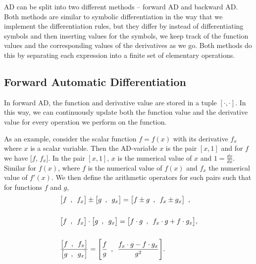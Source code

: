 AD can be split into two different methods -- forward AD and backward AD. Both methods are similar to symbolic differentiation in the way that we implement the differentiation rules, but they differ by instead of differentiating symbols and then inserting values for the symbols, we keep track of the function values and the corresponding values of the derivatives as we go. Both methods do this by separating each expression into a finite set of elementary operations. 

\subsection{Forward Automatic Differentiation}
In forward AD, the function and derivative value are stored in a tuple $[\cdot, \cdot]$. In this way, we can continuously update both the function value and the derivative value for every operation we perform on the function. 

As an example, consider the scalar function $f = f(x)$ with its derivative $f_x$ where $x$ is a scalar variable. Then the AD-variable $x$ is the pair $[x, 1]$ and for $f$ we have [$f$, $f_x$]. In the pair $[x,1]$, $x$ is the numerical value of $x$ and $1 = \frac{dx}{dx}$. Similar for $f(x)$, where $f$ is the numerical value of $f(x)$ and $f_x$ the numerical value of $f'(x)$.  We then define the arithmetic operators for such pairs such that for functions $f$ and $g$,
\begin{equation}
    \begin{aligned}
    &\big[f \hspace{0.5em}, \hspace{0.5em}  f_x\big] \pm \big[g \hspace{0.5em} , \hspace{0.5em}  g_x\big] = \big[f \pm g \hspace{0.5em} , \hspace{0.5em}  f_x \pm g_x\big] \hspace{0.5em}, \\\\
    &\big[f \hspace{0.5em} , \hspace{0.5em}  f_x\big]\cdot \big[g \hspace{0.5em} , \hspace{0.5em}  g_x\big] = \big[f\cdot g \hspace{0.5em} , \hspace{0.5em}  f_x\cdot g + f\cdot g_x\big],\\\\
    &\frac{\big[f \hspace{0.5em} , \hspace{0.5em}  f_x\big]}{\big[g \hspace{0.5em} , \hspace{0.5em}  g_x\big]} = \Bigg[\frac{f}{g} \hspace{0.5em} , \hspace{0.5em}  \frac{f_x\cdot g - f\cdot g_x}{g^2}\Bigg].
\end{aligned}
\label{eq:arithmeticOperators}
\end{equation}

